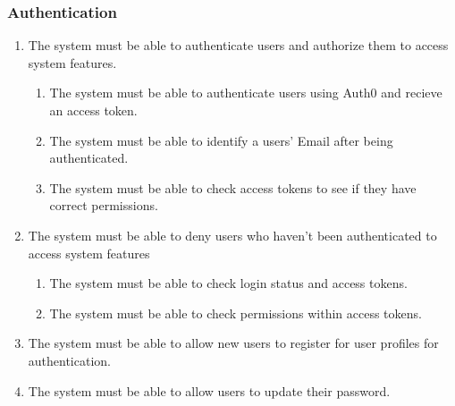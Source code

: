 \documentclass[11pt]{article}
\begin{document}
\subsubsection{Authentication}
\begin{enumerate}[label=R1.\arabic*.]
	\item The system must be able to authenticate users and authorize them to access system features.
	\begin{enumerate}[label*=\arabic*.]
		\item The system must be able to authenticate users using Auth0 and recieve an access token.
		\item The system must be able to identify a users' Email after being authenticated.
		\item The system must be able to check access tokens to see if they have correct permissions.
	\end{enumerate}
	\item The system must be able to deny users who haven't been authenticated to access system features
	\begin{enumerate}[label*=\arabic*.]
		\item The system must be able to check login status and access tokens.
		\item The system must be able to check permissions within access tokens.
	\end{enumerate}
	\item The system must be able to allow new users to register for user profiles for authentication.
	\item The system must be able to allow users to update their password.
\end{enumerate}
\end{document}
